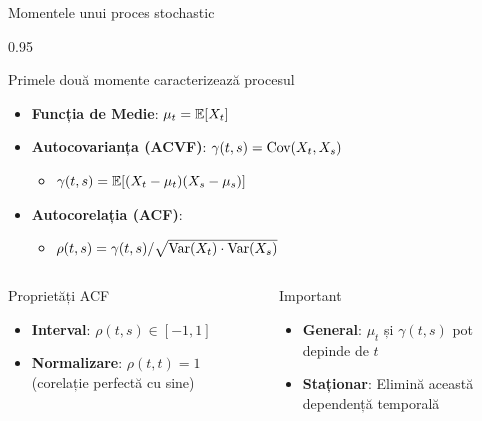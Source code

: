 \documentclass[9pt, aspectratio=169, t]{beamer}
\begin{document}
\begin{frame}{Momentele unui proces stochastic}
    \begin{cminipage}{0.95\textwidth}
        \begin{block}{Primele două momente caracterizează procesul}
            \begin{itemize}\setlength{\itemsep}{0pt}
                \item \textbf{Funcția de Medie}: $\mu_t = \mathbb{E}[X_t]$
                \item \textbf{Autocovarianța (ACVF)}: $\gamma(t, s) = \text{Cov}(X_t, X_s)$
                \begin{itemize}
                    \item $\gamma(t, s) = \mathbb{E}[(X_t - \mu_t)(X_s - \mu_s)]$
                \end{itemize}
                \item \textbf{Autocorelația (ACF)}:
                \begin{itemize}
                    \item $\rho(t, s) = \gamma(t, s) / \sqrt{\text{Var}(X_t) \cdot \text{Var}(X_s)}$
                \end{itemize}
            \end{itemize}
        \end{block}

        \begin{columns}[T]
            \begin{exampleblock}{Proprietăți ACF}
                \begin{itemize}\setlength{\itemsep}{0pt}
                    \item \textbf{Interval}: $\rho(t, s) \in [-1, 1]$
                    \item \textbf{Normalizare}: $\rho(t, t) = 1$ (corelație perfectă cu sine)
                \end{itemize}
            \end{exampleblock}
            \begin{alertblock}{Important}
                \begin{itemize}\setlength{\itemsep}{0pt}
                    \item \textbf{General}: $\mu_t$ și $\gamma(t,s)$ pot depinde de $t$
                    \item \textbf{Staționar}: Elimină această dependență temporală
                \end{itemize}
            \end{alertblock}
        \end{columns}
    \end{cminipage}
\end{frame}
\end{document}
